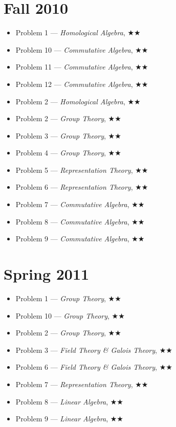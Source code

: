 \documentclass[11pt,letterpaper]{book}
\begin{document}
\section*{Fall 2010}
\begin{itemize}
\item Problem 1 --- \textit{Homological Algebra}, $\bigstar\bigstar$
\item Problem 10 --- \textit{Commutative Algebra}, $\bigstar\bigstar$
\item Problem 11 --- \textit{Commutative Algebra}, $\bigstar\bigstar$
\item Problem 12 --- \textit{Commutative Algebra}, $\bigstar\bigstar$
\item Problem 2 --- \textit{Homological Algebra}, $\bigstar\bigstar$
\item Problem 2 --- \textit{Group Theory}, $\bigstar\bigstar$
\item Problem 3 --- \textit{Group Theory}, $\bigstar\bigstar$
\item Problem 4 --- \textit{Group Theory}, $\bigstar\bigstar$
\item Problem 5 --- \textit{Representation Theory}, $\bigstar\bigstar$
\item Problem 6 --- \textit{Representation Theory}, $\bigstar\bigstar$
\item Problem 7 --- \textit{Commutative Algebra}, $\bigstar\bigstar$
\item Problem 8 --- \textit{Commutative Algebra}, $\bigstar\bigstar$
\item Problem 9 --- \textit{Commutative Algebra}, $\bigstar\bigstar$
\end{itemize}

\section*{Spring 2011}
\begin{itemize}
\item Problem 1 --- \textit{Group Theory}, $\bigstar\bigstar$
\item Problem 10 --- \textit{Group Theory}, $\bigstar\bigstar$
\item Problem 2 --- \textit{Group Theory}, $\bigstar\bigstar$
\item Problem 3 --- \textit{Field Theory \& Galois Theory}, $\bigstar\bigstar$
\item Problem 6 --- \textit{Field Theory \& Galois Theory}, $\bigstar\bigstar$
\item Problem 7 --- \textit{Representation Theory}, $\bigstar\bigstar$
\item Problem 8 --- \textit{Linear Algebra}, $\bigstar\bigstar$
\item Problem 9 --- \textit{Linear Algebra}, $\bigstar\bigstar$
\end{itemize}
\end{document}
